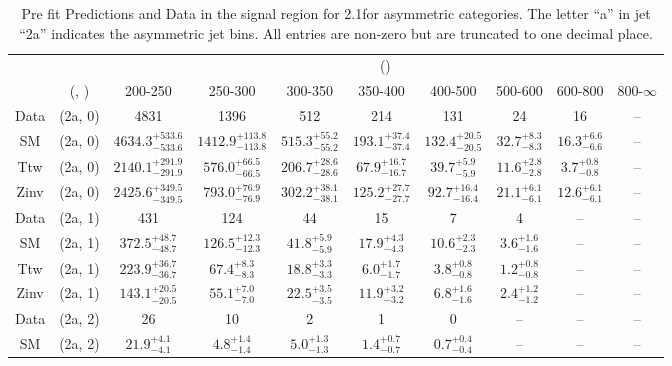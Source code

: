 \begin{table}[h!]
\tiny
\centering
\caption{Pre fit Predictions and Data in the signal region for 2.1\ifb for asymmetric categories. The letter ``a'' in jet \eg ``2a''  indicates the asymmetric jet bins. All entries are non-zero but are truncated to one decimal place.\label{tab:predall_sig_comb_asym}}
\begin{tabular}
{cccccccccc}
	\hline\hline
	&	& \multicolumn{8}{c}{\scalht (\gev)}\\ 
	&	 (\njet, \nb) & 200-250 & 250-300 & 300-350 & 350-400 & 400-500 & 500-600 & 600-800 & 800-$\infty$ \\ [0.8ex] 
\hline
	Data & (2a, 0) & 4831 & 1396 & 512 & 214 & 131 & 24 & 16 & -- \\[0.5ex] 
	SM & (2a, 0) & $4634.3^{+ 533.6 }_{- 533.6 }$ & $1412.9^{+ 113.8 }_{- 113.8 }$ & $515.3^{+ 55.2 }_{- 55.2 }$ & $193.1^{+ 37.4 }_{- 37.4 }$ & $132.4^{+ 20.5 }_{- 20.5 }$ & $32.7^{+ 8.3 }_{- 8.3 }$ & $16.3^{+ 6.6 }_{- 6.6 }$ & -- \\[0.5ex] 
	Ttw & (2a, 0) & $2140.1^{+ 291.9 }_{- 291.9 }$ & $576.0^{+ 66.5 }_{- 66.5 }$ & $206.7^{+ 28.6 }_{- 28.6 }$ & $67.9^{+ 16.7 }_{- 16.7 }$ & $39.7^{+ 5.9 }_{- 5.9 }$ & $11.6^{+ 2.8 }_{- 2.8 }$ & $3.7^{+ 0.8 }_{- 0.8 }$ & -- \\[0.5ex] 
	Zinv & (2a, 0) & $2425.6^{+ 349.5 }_{- 349.5 }$ & $793.0^{+ 76.9 }_{- 76.9 }$ & $302.2^{+ 38.1 }_{- 38.1 }$ & $125.2^{+ 27.7 }_{- 27.7 }$ & $92.7^{+ 16.4 }_{- 16.4 }$ & $21.1^{+ 6.1 }_{- 6.1 }$ & $12.6^{+ 6.1 }_{- 6.1 }$ & -- \\[0.5ex] 
	Data & (2a, 1) & 431 & 124 & 44 & 15 & 7 & 4 & -- & -- \\[0.5ex] 
	SM & (2a, 1) & $372.5^{+ 48.7 }_{- 48.7 }$ & $126.5^{+ 12.3 }_{- 12.3 }$ & $41.8^{+ 5.9 }_{- 5.9 }$ & $17.9^{+ 4.3 }_{- 4.3 }$ & $10.6^{+ 2.3 }_{- 2.3 }$ & $3.6^{+ 1.6 }_{- 1.6 }$ & -- & -- \\[0.5ex] 
	Ttw & (2a, 1) & $223.9^{+ 36.7 }_{- 36.7 }$ & $67.4^{+ 8.3 }_{- 8.3 }$ & $18.8^{+ 3.3 }_{- 3.3 }$ & $6.0^{+ 1.7 }_{- 1.7 }$ & $3.8^{+ 0.8 }_{- 0.8 }$ & $1.2^{+ 0.8 }_{- 0.8 }$ & -- & -- \\[0.5ex] 
	Zinv & (2a, 1) & $143.1^{+ 20.5 }_{- 20.5 }$ & $55.1^{+ 7.0 }_{- 7.0 }$ & $22.5^{+ 3.5 }_{- 3.5 }$ & $11.9^{+ 3.2 }_{- 3.2 }$ & $6.8^{+ 1.6 }_{- 1.6 }$ & $2.4^{+ 1.2 }_{- 1.2 }$ & -- & -- \\[0.5ex] 
	Data & (2a, 2) & 26 & 10 & 2 & 1 & 0 & -- & -- & -- \\[0.5ex] 
	SM & (2a, 2) & $21.9^{+ 4.1 }_{- 4.1 }$ & $4.8^{+ 1.4 }_{- 1.4 }$ & $5.0^{+ 1.3 }_{- 1.3 }$ & $1.4^{+ 0.7 }_{- 0.7 }$ & $0.7^{+ 0.4 }_{- 0.4 }$ & -- & -- & -- \\[0.5ex] 

\end{tabular}
\end{table}
